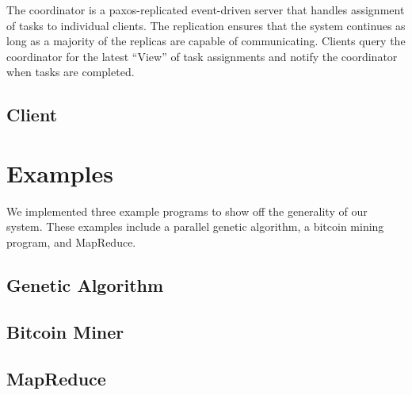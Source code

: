 \documentclass [11pt, twocolumn] {article}
\begin{document}
The coordinator is a paxos-replicated event-driven server that handles assignment of tasks to individual clients. The replication ensures that the system continues as long as a majority of the replicas are capable of communicating. Clients query the coordinator for the latest ``View'' of task assignments and notify the coordinator when tasks are completed.


\subsection {Client} 

\section {Examples}

We implemented three example programs to show off the generality of our system. These examples include a parallel genetic algorithm, a bitcoin mining program, and MapReduce. 

\subsection {Genetic Algorithm} 

\subsection {Bitcoin Miner}

\subsection {MapReduce} 
\end{document}
